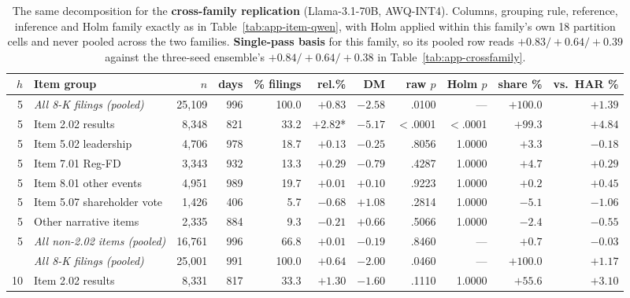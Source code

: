 \begin{table}[p]
\centering
\caption[The 8-K residual by item code, replication family]{The same
decomposition for the \textbf{cross-family replication} (Llama-3.1-70B,
AWQ-INT4). Columns, grouping rule, reference, inference and Holm family
exactly as in Table~\ref{tab:app-item-qwen}, with Holm applied within this
family's own 18 partition cells and never pooled across the two families.
\textbf{Single-pass basis} for this family, so its pooled row reads
$+0.83/+0.64/+0.39$ against the three-seed ensemble's
$+0.84/+0.64/+0.38$ in Table~\ref{tab:app-crossfamily}.}
\label{tab:app-item-llama}
\singlespacing\footnotesize
\setlength{\tabcolsep}{3.5pt}
\begin{tabular}{@{}rlrrrrrrrrr@{}}
\toprule
$h$ & Item group & $n$ & days & \% filings & rel.\% & DM & raw $p$ & Holm $p$ & share \% & vs.\ HAR \% \\
\midrule
5 & \emph{All 8-K filings (pooled)} & 25{,}109 & 996 & 100.0 & $+0.83$\phantom{*} & $-2.58$ & .0100 & --- & $+100.0$ & $+1.39$ \\
5 & Item 2.02 results & 8{,}348 & 821 & 33.2 & $+2.82$* & $-5.17$ & $<$.0001 & $<$.0001 & $+99.3$ & $+4.84$ \\
5 & Item 5.02 leadership & 4{,}706 & 978 & 18.7 & $+0.13$\phantom{*} & $-0.25$ & .8056 & 1.0000 & $+3.3$ & $-0.18$ \\
5 & Item 7.01 Reg-FD & 3{,}343 & 932 & 13.3 & $+0.29$\phantom{*} & $-0.79$ & .4287 & 1.0000 & $+4.7$ & $+0.29$ \\
5 & Item 8.01 other events & 4{,}951 & 989 & 19.7 & $+0.01$\phantom{*} & $+0.10$ & .9223 & 1.0000 & $+0.2$ & $+0.45$ \\
5 & Item 5.07 shareholder vote & 1{,}426 & 406 & 5.7 & $-0.68$\phantom{*} & $+1.08$ & .2814 & 1.0000 & $-5.1$ & $-1.06$ \\
5 & Other narrative items & 2{,}335 & 884 & 9.3 & $-0.21$\phantom{*} & $+0.66$ & .5066 & 1.0000 & $-2.4$ & $-0.55$ \\
5 & \emph{All non-2.02 items (pooled)} & 16{,}761 & 996 & 66.8 & $+0.01$\phantom{*} & $-0.19$ & .8460 & --- & $+0.7$ & $-0.03$ \\
\addlinespace
10 & \emph{All 8-K filings (pooled)} & 25{,}001 & 991 & 100.0 & $+0.64$\phantom{*} & $-2.00$ & .0460 & --- & $+100.0$ & $+1.17$ \\
10 & Item 2.02 results & 8{,}331 & 817 & 33.3 & $+1.30$\phantom{*} & $-1.60$ & .1110 & 1.0000 & $+55.6$ & $+3.10$ \\

\end{tabular}
\end{table}
